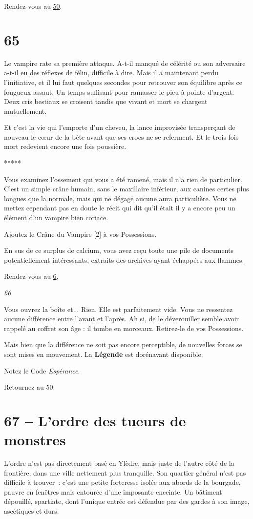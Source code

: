 \documentclass{report}
\newcommand{\gsection}[1]{
    \section{#1}
    \label{section-#1}
}
\newcommand{\glink}[1]{\hyperref[section-#1]{#1}}
\newcommand{\ellipse}{
    \begin{center}
        *****
    \end{center}
}
\newcommand{\hero}[1]{
    \textbf{#1}
}
\begin{document}
Rendez-vous au \glink{50}.

\gsection{65}

Le vampire rate sa première attaque. A-t-il manqué de célérité ou son adversaire a-t-il eu des réflexes de félin, difficile à dire. Mais il a maintenant perdu l'initiative, et il lui faut quelques secondes pour retrouver son équilibre après ce fougueux assaut. Un temps suffisant pour ramasser le pieu à pointe d'argent. Deux cris bestiaux se croisent tandis que vivant et mort se chargent mutuellement.

Et c'est la vie qui l'emporte d'un cheveu, la lance improvisée transperçant de nouveau le cœur de la bête avant que ses crocs ne se referment. Et le trois fois mort redevient encore une fois poussière.

\ellipse

Vous examinez l'ossement qui vous a été ramené, mais il n'a rien de particulier. C'est un simple crâne humain, sans le maxillaire inférieur, aux canines certes plus longues que la normale, mais qui ne dégage aucune aura particulière. Vous ne mettez cependant pas en doute le récit qui dit qu'il était il y a encore peu un élément d'un vampire bien coriace.

Ajoutez le Crâne du Vampire [2] à vos Possessions.

En sus de ce surplus de calcium, vous avez reçu toute une pile de documents potentiellement intéressants, extraits des archives ayant échappées aux flammes.

Rendez-vous au \glink{6}.

\emph{66}

Vous ouvrez la boîte et... Rien. Elle est parfaitement vide. Vous ne ressentez aucune différence entre l'avant et l'après. Ah si, de le déverouiller semble avoir rappelé au coffret son âge : il tombe en morceaux. Retirez-le de vos Possessions.

Mais bien que la différence ne soit pas encore perceptible, de nouvelles forces se sont mises en mouvement. La \hero{Légende} est dorénavant disponible.

Notez le Code \emph{Espérance}.

Retournez au 50.

\gsection{67 – L'ordre des tueurs de monstres}

L'ordre n'est pas directement basé en Ylèdre, mais juste de l'autre côté de la frontière, dans une ville nettement plus tranquille. Son quartier général n'est pas difficile à trouver : c'est une petite forteresse isolée aux abords de la bourgade, pauvre en fenêtres mais entourée d'une imposante enceinte. Un bâtiment dépouillé, spartiate, dont l'unique entrée est défendue par des gardes à son image, ascétiques et durs.
\end{document}
